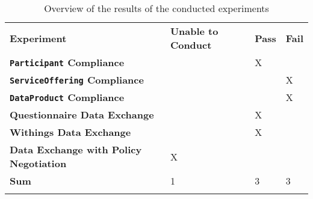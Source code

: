 \begin{longtable}{ |p{7cm}|p{3.5cm}|p{1cm}|p{1cm}| }
	\hhline{----}
	\textbf{Experiment} & \textbf{Unable to Conduct} & \textbf{Pass} & \textbf{Fail}\\
	\hhline{----}
	\textbf{\texttt{Participant} Compliance} &&X&\\
	\hhline{----}
	\textbf{\texttt{ServiceOffering} Compliance} &&&X\\
	\hhline{----}
	\textbf{\texttt{DataProduct} Compliance} &&&X\\
	\hhline{----}
	\textbf{Questionnaire Data Exchange} &&X&\\
	\hhline{----}
	\textbf{Withings Data Exchange} &&X&\\
	\hhline{----}
	\textbf{Data Exchange with Policy Negotiation} &X&&\\
	\hhline{----}
	\textbf{Sum} &1&3&3\\
	\hhline{----}
	\caption{Overview of the results of the conducted experiments}
	\label{tab:results}
\end{longtable}
